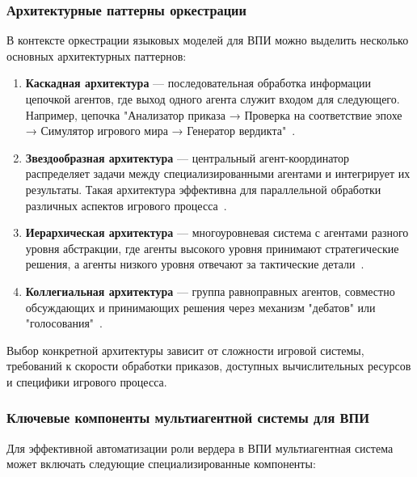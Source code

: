 \subsubsection{Архитектурные паттерны оркестрации}

В контексте оркестрации языковых моделей для ВПИ можно выделить несколько основных архитектурных паттернов:

\begin{enumerate}
    \item \textbf{Каскадная архитектура} — последовательная обработка информации цепочкой агентов, где выход одного агента служит входом для следующего. Например, цепочка "Анализатор приказа → Проверка на соответствие эпохе → Симулятор игрового мира → Генератор вердикта"~\cite{shen2023hugginggpt}.

    \item \textbf{Звездообразная архитектура} — центральный агент-координатор распределяет задачи между специализированными агентами и интегрирует их результаты. Такая архитектура эффективна для параллельной обработки различных аспектов игрового процесса~\cite{mialon2023augmented}.

    \item \textbf{Иерархическая архитектура} — многоуровневая система с агентами разного уровня абстракции, где агенты высокого уровня принимают стратегические решения, а агенты низкого уровня отвечают за тактические детали~\cite{wu2023autogen}.

    \item \textbf{Коллегиальная архитектура} — группа равноправных агентов, совместно обсуждающих и принимающих решения через механизм "дебатов" или "голосования"~\cite{du2023improving}.
\end{enumerate}

Выбор конкретной архитектуры зависит от сложности игровой системы, требований к скорости обработки приказов, доступных вычислительных ресурсов и специфики игрового процесса.

\subsubsection{Ключевые компоненты мультиагентной системы для ВПИ}

Для эффективной автоматизации роли вердера в ВПИ мультиагентная система может включать следующие специализированные компоненты:

